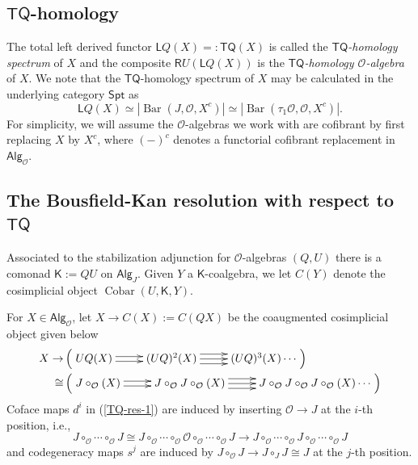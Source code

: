 \documentclass[11pt]{amsart}
\theoremstyle{definition}
\theoremstyle{remark}
\newcommand{\Spt}{\mathsf{Spt}}
\newcommand{\TQ}{\mathsf{TQ}}
\newcommand{\Alg}[1]{ {\mathsf{Alg}_{\mathcal{#1}}} }
\newcommand{\Cobar}{\operatorname{Cobar}}
\newcommand{\Barr}{\operatorname{Bar}}
\newcommand{\Cal}[1]{\mathcal{#1}}
\begin{document}
\subsection{$\TQ$-homology}
The total left derived functor $\mathsf{L}Q(X)=:\TQ(X)$ is called the \textit{$\TQ$-homology spectrum} of $X$ and the composite $\mathsf{R}U(\mathsf{L}Q(X))$ is the \textit{$\TQ$-homology $\Cal{O}$-algebra} of $X$. We note that the $\TQ$-homology spectrum of $X$ may be calculated in the underlying category $\Spt$ as \begin{equation*}
    \mathsf{L}Q(X)\simeq |\Barr(J,\Cal{O}, X^c)|\simeq |\Barr(\tau_1\Cal{O}, \Cal{O}, X^c)|.
\end{equation*}
For simplicity, we will assume the $\Cal{O}$-algebras we work with are cofibrant by first replacing $X$ by $X^c$, where $(-)^c$ denotes a functorial cofibrant replacement in $\Alg{O}$.

\subsection{The Bousfield-Kan resolution with respect to $\TQ$} \label{sec:TQ-completion}
Associated to the stabilization adjunction for $\Cal{O}$-algebras $(Q,U)$ there is a comonad $\mathsf{K}:=QU$ on $\mathsf{Alg}_J$. Given $Y$ a $\mathsf{K}$-coalgebra, we let $C(Y)$ denote the cosimplicial object $\Cobar(U, \mathsf{K}, Y)$.  

For $X\in \Alg{O}$, let $X\to C(X):= C(QX)$ be the coaugmented cosimplicial object given below \begin{align}
\label{TQ-res-1}
    X \to &\left( \xymatrix{
    UQ(X) \ar@<.5 ex>[r] \ar@<-.5ex>[r] &
    (UQ)^2 (X) \ar@<1 ex>[r] \ar[r] \ar@<-1 ex>[r] &
    (UQ)^3(X) \cdots
    }\right)\\
    \cong &\left(\xymatrix{ J\circ_{\Cal{O}}(X) \ar@<.5 ex>[r] \ar@<-.5ex>[r] &
    J\circ_{\Cal{O}}J\circ_{\Cal{O}}(X) \ar@<1 ex>[r] \ar[r] \ar@<-1 ex>[r] &
    J\circ_{\Cal{O}}J\circ_{\Cal{O}}J\circ_{\Cal{O}}(X) \cdots }\right) \nonumber
\end{align} 
Coface maps $d^i$ in (\ref{TQ-res-1}) are induced by inserting $\Cal{O}\to J$ at the $i$-th position, i.e., \[  J \circ_{\Cal{O}} \cdots \circ_{\Cal{O}} J \cong J \circ_{\Cal{O}} \cdots \circ_{\Cal{O}} \Cal{O} \circ_{\Cal{O}} \cdots \circ_{\Cal{O}} J \to J \circ_{\Cal{O}} \cdots \circ_{\Cal{O}} J \circ_{\Cal{O}} \cdots \circ_{\Cal{O}} J\] and codegeneracy maps $s^j$ are induced by $J\circ_{\Cal{O}} J\to J\circ_J J\cong J$ at the $j$-th position. 
\end{document}
